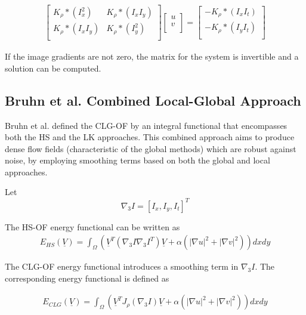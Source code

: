 \documentclass{article}
\begin{document}
\begin{align}
  \left[
    \begin{matrix}
      K_\rho * (I_x^2)   & K_\rho * (I_x I_y) \\
      K_\rho * (I_x I_y) & K_\rho * (I_y^2) \\
    \end{matrix}
  \right]
  \left[
    \begin{matrix}
      u \\
      v \\
    \end{matrix}
  \right]
=
  \left[
    \begin{matrix}
      - K_\rho * (I_x I_t) \\
      - K_\rho * (I_y I_t) \\
    \end{matrix}
  \right]
\end{align}

If the image gradients are not zero, the matrix for the system is invertible 
and a solution can be computed.


\subsection{Bruhn et al. Combined Local-Global Approach}

Bruhn et al. \cite{Bruhn02} defined the CLG-OF by an integral functional 
that encompasses both the HS and the LK approaches. This combined approach 
aims to produce dense flow fields (characteristic of the global methods) which 
are robust against noise, by employing smoothing terms based on both the global 
and local approaches.

Let
\[ \nabla_3I = [I_x, I_y, I_t]^T \]

The HS-OF energy functional can be written as
\begin{align}
 E_{HS}(\underline{V}) = \int_{\Omega}
                          (\underline{V}^T (\nabla_3I \nabla_3I^T) \underline{V}
                         + \alpha(|\nabla u|^2+|\nabla v|^2)) dx dy
\end{align}

The CLG-OF energy functional introduces a smoothing term in $\nabla_3I$. The 
corresponding energy functional is defined as

\begin{align}
 E_{CLG}(\underline{V}) = \int_{\Omega}
                          (\underline{V}^T J_\rho(\nabla_3I)\underline{V}
                         + \alpha(|\nabla u|^2+|\nabla v|^2)) dx dy
\end{align}
\end{document}
